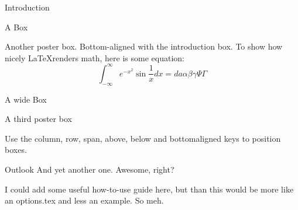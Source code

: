 \documentclass[
  a0paper,
  portrait,
  fontscale=.35 %
  ]{baposterrptu}
\begin{document}
\begin{poster}{
  }
\begin{posterbox}[name=intro,column=0,row=0]{Introduction}
  \end{posterbox}

  \begin{posterbox}[name=test,column=1,row=0, bottomaligned=intro]{A Box}

    Another poster box. Bottom-aligned with the introduction box. To show how nicely \LaTeX renders math, here is some equation:
    $$\int_{-\infty}^{\infty}e^{-x^2}\sin{\frac{1}{x}}dx =da \alpha\beta\gamma\Psi\Gamma$$

  \end{posterbox}

  \begin{posterbox}[name=test2,column=0,below=intro, span=2]{A wide Box}

    A third poster box

    Use the column, row, span, above, below and bottomaligned keys to position boxes.

  \end{posterbox}

  \begin{posterbox}[below=test2, column=1]{Outlook}
    And yet another one. Awesome, right?

    I could add some useful how-to-use guide here, but than this would be more like an options.tex and less an example. So meh.
  \end{posterbox}

\end{poster}
\end{document}
